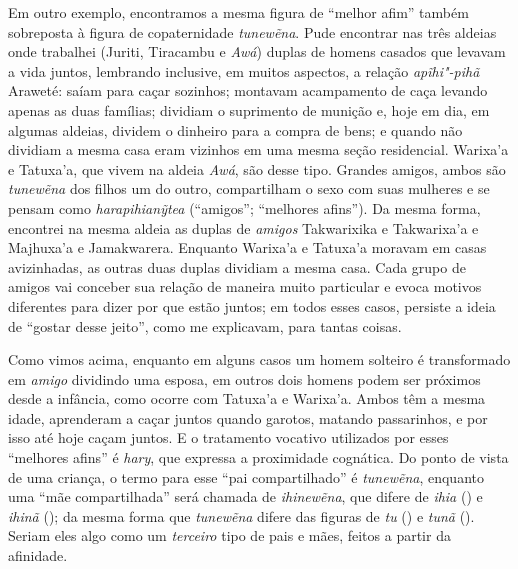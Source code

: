 Em outro exemplo, encontramos a mesma figura de ``melhor afim'' também
sobreposta à figura de copaternidade \emph{tunewẽna}. Pude encontrar nas
três aldeias onde trabalhei (Juriti, Tiracambu e \emph{Awá}) duplas de
homens casados que levavam a vida juntos, lembrando inclusive, em muitos
aspectos, a relação \emph{apĩhi"-pihã} Araweté: saíam para caçar
sozinhos; montavam acampamento de caça levando apenas as duas famílias;
dividiam o suprimento de munição e, hoje em dia, em algumas aldeias,
dividem o dinheiro para a compra de bens; e quando não dividiam a mesma
casa eram vizinhos em uma mesma seção residencial. Warixa'a e Tatuxa'a,
que vivem na aldeia \emph{Awá}, são desse tipo. Grandes amigos, ambos
são \emph{tunewẽna} dos filhos um do outro, compartilham o sexo com suas
mulheres e se pensam como \emph{harapihianỹtea} (``amigos''; ``melhores
afins''). Da mesma forma, encontrei na mesma aldeia as duplas de
\emph{amigos} Takwarixika e Takwarixa'a e Majhuxa'a e Jamakwarera.
Enquanto Warixa'a e Tatuxa'a moravam em casas avizinhadas, as outras
duas duplas dividiam a mesma casa. Cada grupo de amigos vai conceber sua
relação de maneira muito particular e evoca motivos diferentes para
dizer por que estão juntos; em todos esses casos, persiste a ideia de
``gostar desse jeito'', como me explicavam, para tantas coisas.

Como vimos acima, enquanto em alguns casos um homem solteiro é
transformado em \emph{amigo} dividindo uma esposa, em outros dois homens
podem ser próximos desde a infância, como ocorre com Tatuxa'a e
Warixa'a. Ambos têm a mesma idade, aprenderam a caçar juntos quando
garotos, matando passarinhos, e por isso até hoje caçam juntos. E o
tratamento vocativo utilizados por esses ``melhores afins'' é
\emph{hary}, que expressa a proximidade cognática. Do ponto de vista de
uma criança, o termo para esse ``pai compartilhado'' é \emph{tunewẽna},
enquanto uma ``mãe compartilhada'' será chamada de \emph{ihinewẽna}, que
difere de \emph{ihia} () e \emph{ihinã} (); da mesma forma que
\emph{tunewẽna} difere das figuras de \emph{tu} () e \emph{tunã} ().
Seriam eles algo como um \emph{terceiro} tipo de pais e mães, feitos a
partir da afinidade.


